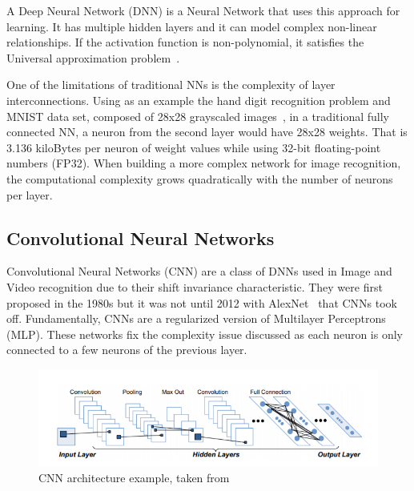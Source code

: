 A Deep Neural Network (DNN) is a Neural Network that uses this approach for
learning. It has multiple hidden layers and it can model complex non-linear
relationships. If the activation function is non-polynomial, it satisfies the
Universal approximation problem~\cite{approximation:problem}.

One of the limitations of traditional NNs is the complexity of layer
interconnections. Using as an example the hand digit recognition problem and MNIST
data set, composed of 28x28 grayscaled images~\cite{mnist:digits}, in a
traditional fully connected NN, a neuron from the second layer would have 28x28
weights. That is 3.136 kiloBytes per neuron of weight values while using 32-bit
floating-point numbers (FP32). When building a more complex network for image
recognition, the computational complexity grows quadratically with the number
of neurons per layer.


\subsection{Convolutional Neural Networks}
\label{section:subcnn}

Convolutional Neural Networks (CNN) are a class of DNNs used in Image and Video
recognition due to their shift invariance characteristic. They were first
proposed in the 1980s but it was not until 2012 with AlexNet~\cite{alexnet} that
CNNs took off. Fundamentally, CNNs are a regularized version of
Multilayer Perceptrons (MLP). These networks fix the complexity issue discussed
as each neuron is only connected to a few neurons of the previous layer.
 

 \begin{figure}[!htbp]
    \centering
    \includegraphics[width=1\textwidth]{Figures/convolutionlayer.png}
    \caption{CNN architecture example, taken from~\cite{cgracnn}}
    \label{CNNl}
\end{figure} 

